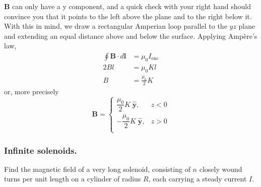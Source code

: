 \documentclass[../../../main.tex]{subfiles}
\begin{document}
\textbf{B} can only have a y component, and a quick check with your right hand should convince you that it points to the left above the plane and to the right below it. With this in mind, we draw a rectangular Amperian loop parallel to the $yz$ plane and extending an equal distance above and below the 
surface. Applying Ampère’s law,
\begin{align*}
    \oint \mathbf{B}\cdot d\mathbf{l}&=\mu_0I_{\text{enc}}\\
    2Bl&=\mu_0Kl\\
    B&=\frac{\mu_0}{2}K
\end{align*}
or, more precisely
\begin{equation*}
    \mathbf{B}=
    \begin{cases}
        \dfrac{\mu_0}{2}K\;\mathbf{\hat{y}},&z<0\\
        -\dfrac{\mu_0}{2}K\;\mathbf{\hat{y}},&z>0\\
    \end{cases}
\end{equation*}

\subsubsection{Inﬁnite solenoids.} Find the magnetic ﬁeld of a very long solenoid, consisting of $n$ closely wound turns per unit length on a cylinder of radius $R$, each carrying a steady current $I$.

\begin{figure*}[ht]
    \centering
\end{figure*}
\end{document}
